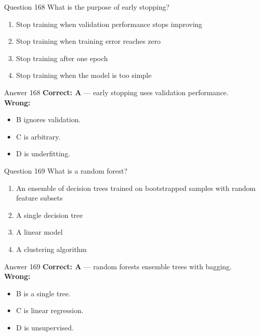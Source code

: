 \documentclass[aspectratio=169,11pt]{beamer}
\begin{document}
	\begin{frame}{Question 168}
		What is the purpose of early stopping?
		\begin{enumerate}[label=\Alph*.]
			\item Stop training when validation performance stops improving
			\item Stop training when training error reaches zero
			\item Stop training after one epoch
			\item Stop training when the model is too simple
		\end{enumerate}
	\end{frame}
	\begin{frame}{Answer 168}
		\textbf{Correct: A} --- early stopping uses validation performance.\\
		\vspace{0.5em}
		\textbf{Wrong:}
		\begin{itemize}
			\item B ignores validation.
			\item C is arbitrary.
			\item D is underfitting.
		\end{itemize}
	\end{frame}
	
	\begin{frame}{Question 169}
		What is a random forest?
		\begin{enumerate}[label=\Alph*.]
			\item An ensemble of decision trees trained on bootstrapped samples with random feature subsets
			\item A single decision tree
			\item A linear model
			\item A clustering algorithm
		\end{enumerate}
	\end{frame}
	\begin{frame}{Answer 169}
		\textbf{Correct: A} --- random forests ensemble trees with bagging.\\
		\vspace{0.5em}
		\textbf{Wrong:}
		\begin{itemize}
			\item B is a single tree.
			\item C is linear regression.
			\item D is unsupervised.
		\end{itemize}
	\end{frame}
	
\end{document}
